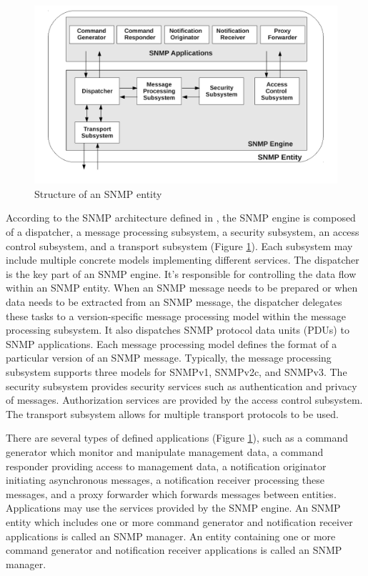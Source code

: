 \begin{figure}[htp]	
\begin{center}
    \includegraphics[scale = 0.6]{img/snmp-arch.pdf}
    \caption{Structure of an SNMP entity}   
	\label{fig:snmparch}
\end{center}
\end{figure}

According to the SNMP architecture defined in \cite{rfc3411}, the SNMP engine is composed of a dispatcher, a message processing subsystem, a security subsystem, an access control subsystem, and a transport subsystem (Figure \ref{fig:snmparch}). Each subsystem may include multiple concrete models implementing different services. The dispatcher is the key part of an SNMP engine. It's responsible for controlling the data flow within an SNMP entity. When an SNMP message needs to be prepared or when data needs to be extracted from an SNMP message, the dispatcher delegates these tasks to a version-specific message processing model within the message processing subsystem. It also dispatches SNMP  protocol data units (PDUs) to SNMP applications. Each message processing model defines the format of a particular version of an SNMP message. Typically, the message processing subsystem supports three models for SNMPv1, SNMPv2c, and SNMPv3. The security subsystem provides security services such as authentication and privacy of messages. Authorization services are provided by the access control subsystem. The transport subsystem \cite{rfc5590} allows for multiple transport protocols to be used.

There are several types of defined applications (Figure \ref{fig:snmparch}), such as a command generator which monitor and manipulate management data, a command responder providing access to management data, a notification originator initiating asynchronous messages, a notification receiver processing these messages, and a proxy forwarder which forwards messages between entities. Applications may use the services provided by the SNMP engine. An SNMP entity which includes one or more command generator and notification receiver applications is called an SNMP manager. An entity containing one or more command generator and notification receiver applications is called an SNMP manager.

